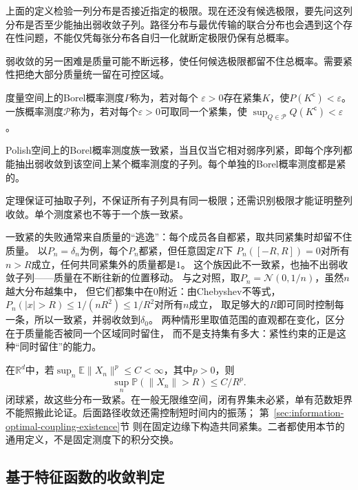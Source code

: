 上面的定义检验一列分布是否接近指定的极限。现在还没有候选极限，要先问这列分布是否至少能抽出弱收敛子列。路径分布与最优传输的联合分布也会遇到这个存在性问题，不能仅凭每张分布各自归一化就断定极限仍保有总概率。

弱收敛的另一困难是质量可能不断远移，使任何候选极限都留不住总概率。需要紧性把绝大部分质量统一留在可控区域。
\begin{definition}[紧概率测度与一致紧族]
\label{def:information-tightness}
度量空间上的Borel概率测度\(P\)称为，若对每个
\(\varepsilon>0\)存在紧集\(K\)，使\(P(K^{\mathsf c})<\varepsilon\)。
一族概率测度\(\mathcal P\)称为，若对每个\(\varepsilon>0\)可取同一个紧集，使
\(\sup_{Q\in\mathcal P}Q(K^{\mathsf c})<\varepsilon\)。
\end{definition}
\begin{theorem}[Prokhorov定理]
\label{thm:rv-prokhorov}
Polish空间上的Borel概率测度族一致紧，当且仅当它相对弱序列紧，即每个序列都能抽出弱收敛到该空间上某个概率测度的子列。每个单独的Borel概率测度都是紧的。
\end{theorem}
定理保证可抽取子列，不保证所有子列具有同一极限；还需识别极限才能证明整列收敛。单个测度紧也不等于一个族一致紧。

一致紧的失败通常来自质量的“逃逸”：每个成员各自都紧，取共同紧集时却留不住质量。
以\(P_n=\delta_n\)为例，每个\(P_n\)都紧，但任意固定\(R\)下
\(P_n([-R,R])=0\)对所有\(n>R\)成立，任何共同紧集外的质量都是\(1\)。
这个族因此不一致紧，也抽不出弱收敛子列——质量在不断往新的位置移动。
与之对照，取\(P_n=\mathcal N(0,1/n)\)，虽然\(n\)越大分布越集中，
但它们都集中在\(0\)附近：由Chebyshev不等式，
\(P_n(|x|>R)\leq1/(nR^2)\leq1/R^2\)对所有\(n\)成立，
取足够大的\(R\)即可同时控制每一条，所以一致紧，并弱收敛到\(\delta_0\)。
两种情形里取值范围的直观都在变化，区分在于质量能否被同一个区域同时留住，
而不是支持集有多大：紧性约束的正是这种“同时留住”的能力。

在\(\mathbb R^d\)中，若\(\sup_n\mathbb E\|X_n\|^p\leq C<\infty\)，其中\(p>0\)，则
\[
\sup_n\mathbb P(\|X_n\|>R)\leq C/R^p.
\]
闭球紧，故这些分布一致紧。在一般无限维空间，闭有界集未必紧，单有范数矩界不能照搬此论证。后面路径收敛还需控制短时间内的振荡；
第~\ref{sec:information-optimal-coupling-existence}节
则在固定边缘下构造共同紧集。二者都使用本节的通用定义，不是固定测度下的积分交换。

\subsection{基于特征函数的收敛判定}
\label{sec:information-characteristic-convergence}

